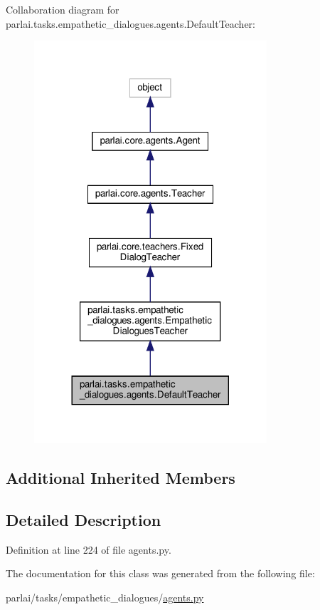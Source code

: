 Collaboration diagram for parlai.\+tasks.\+empathetic\+\_\+dialogues.\+agents.\+Default\+Teacher\+:
\nopagebreak
\begin{figure}[H]
\begin{center}
\leavevmode
\includegraphics[width=245pt]{d4/dcb/classparlai_1_1tasks_1_1empathetic__dialogues_1_1agents_1_1DefaultTeacher__coll__graph}
\end{center}
\end{figure}
\subsection*{Additional Inherited Members}


\subsection{Detailed Description}


Definition at line 224 of file agents.\+py.



The documentation for this class was generated from the following file\+:\begin{DoxyCompactItemize}
\item 
parlai/tasks/empathetic\+\_\+dialogues/\hyperlink{parlai_2tasks_2empathetic__dialogues_2agents_8py}{agents.\+py}\end{DoxyCompactItemize}
